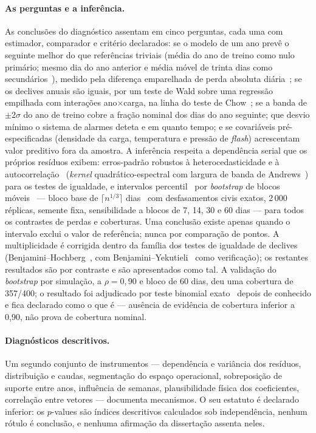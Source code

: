 \paragraph{As perguntas e a inferência.} As conclusões do diagnóstico
assentam em cinco perguntas, cada uma com estimador, comparador e
critério declarados: se o modelo de um ano prevê o seguinte melhor do que
referências triviais (média do ano de treino como nulo primário; mesmo dia
do ano anterior e média móvel de trinta dias como secundários~\cite{HyndmanKoehler2006}), medido
pela diferença emparelhada de perda absoluta diária~\cite{DieboldMariano1995,HarveyLeybourneNewbold1997}; se os declives anuais
são iguais, por um teste de Wald sobre uma regressão empilhada com
interações ano$\times$carga, na linha do teste de Chow~\cite{Chow1960}; se a banda de $\pm2\sigma$ do ano de treino
cobre a fração nominal dos dias do ano seguinte; que desvio mínimo o
sistema de alarmes deteta e em quanto tempo; e se covariáveis
pré-especificadas (densidade da carga, temperatura e pressão de
\emph{flash}) acrescentam valor preditivo fora da amostra. A inferência
respeita a dependência serial que os próprios resíduos exibem: erros-padrão
robustos à heterocedasticidade e à autocorrelação~\cite{NeweyWest1987}
(\emph{kernel} quadrático-espectral com largura de banda de
Andrews~\cite{Andrews1991}) para os testes de igualdade, e intervalos percentil~\cite{Efron1979,EfronTibshirani1993} por
\emph{bootstrap} de blocos móveis~\cite{Kunsch1989,Lahiri2003} --- bloco
base de $\lceil n^{1/3}\rceil$ dias~\cite{HallHorowitzJing1995} com
desfasamentos civis exatos, 2\,000 réplicas, semente fixa, sensibilidade a blocos de 7, 14,
30 e 60 dias --- para todos os contrastes de perdas e coberturas. Uma
conclusão existe apenas quando o intervalo exclui o valor de referência;
nunca por comparação de pontos. A multiplicidade é corrigida dentro da
família dos testes de igualdade de declives (Benjamini--Hochberg~\cite{BenjaminiHochberg1995}, com
Benjamini--Yekutieli~\cite{BenjaminiYekutieli2001} como verificação); os restantes resultados são por
contraste e são apresentados como tal. A validação do \emph{bootstrap} por
simulação, a $\rho = 0{,}90$ e bloco de 60 dias, deu uma cobertura de
357/400; o resultado foi adjudicado por teste binomial exato~\cite{ClopperPearson1934}
depois de conhecido e fica declarado como o que é --- ausência de evidência de
cobertura inferior a 0,90, não prova de cobertura nominal.

\paragraph{Diagnósticos descritivos.} Um segundo conjunto de instrumentos
--- dependência e variância dos resíduos, distribuição e caudas,
segmentação do espaço operacional, sobreposição de suporte entre anos,
influência de semanas, plausibilidade física dos coeficientes, correlação
entre vetores --- documenta mecanismos. O seu estatuto é declarado
inferior: os $p$-values são índices descritivos calculados sob
independência, nenhum rótulo é conclusão, e nenhuma afirmação da
dissertação assenta neles.

